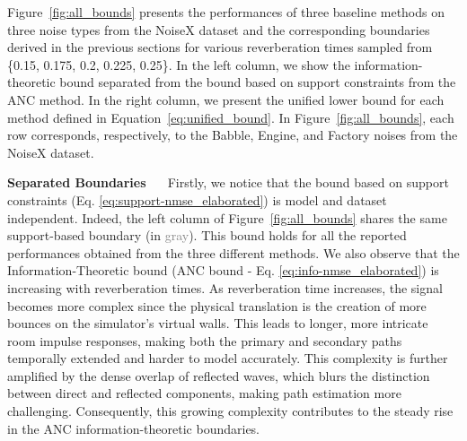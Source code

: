 \documentclass{article}
\begin{document}
Figure~\ref{fig:all_bounds} presents the performances of three baseline methods on three noise types from the NoiseX dataset and the corresponding boundaries derived in the previous sections for various reverberation times sampled from \{0.15, 0.175, 0.2, 0.225, 0.25\}. In the left column, we show the information-theoretic bound separated from the bound based on support constraints from the ANC method. In the right column, we present the unified lower bound for each method defined in Equation~\ref{eq:unified_bound}. In Figure~\ref{fig:all_bounds}, each row corresponds, respectively, to the Babble, Engine, and Factory noises from the NoiseX dataset. 


\textbf{Separated Boundaries~~~}Firstly, we notice that the bound based on support constraints (Eq. \ref{eq:support-nmse_elaborated}) is model and dataset independent. Indeed, the left column of Figure~\ref{fig:all_bounds} shares the same support-based boundary (in \textcolor{gray}{gray}). This bound holds for all the reported performances obtained from the three different methods. We also observe that the Information-Theoretic bound (ANC bound - Eq. \ref{eq:info-nmse_elaborated}) is increasing with reverberation times. 
As reverberation time increases, the signal becomes more complex since the physical translation is the creation of more bounces on the simulator's virtual walls.
This leads to longer, more intricate room impulse responses, making both the primary and secondary paths temporally extended and harder to model accurately. This complexity is further amplified by the dense overlap of reflected waves, which blurs the distinction between direct and reflected components, making path estimation more challenging. Consequently, this growing complexity contributes to the steady rise in the ANC information-theoretic boundaries.
\end{document}
